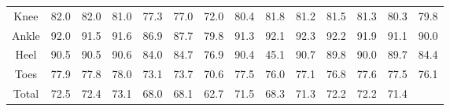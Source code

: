 \documentclass{beamer}
\begin{document}
\begin{frame}
\begin{table}[htbp]
{\begin{adjustbox}{center}
\begin{tabular}{c||ccc|ccc|ccc|ccc|c}
                    Knee & 82.0 & 82.0 & 81.0 & 77.3 & 77.0 & 72.0 & 80.4 & 81.8 & 81.2 & 81.5 & 81.3 & 80.3 & 79.8 \\
                    Ankle & 92.0 & 91.5 & 91.6 & 86.9 & 87.7 & 79.8 & 91.3 & 92.1 & 92.3 & 92.2 & 91.9 & 91.1 & 90.0 \\
                    Heel & 90.5 & 90.5 & 90.6 & 84.0 & 84.7 & 76.9 & 90.4 & 45.1 & 90.7 & 89.8 & 90.0 & 89.7 & 84.4 \\
                    Toes & 77.9 & 77.8 & 78.0 & 73.1 & 73.7 & 70.6 & 77.5 & 76.0 & 77.1 & 76.8 & 77.6 & 77.5 & 76.1 \\
                    \hline
                    Total & 72.5 & 72.4 & 73.1 & 68.0 & 68.1 & 62.7 & 71.5 & 68.3 & 71.3 & 72.2 & 72.2 & 71.4 & \\
                    \hline
                \end{tabular}
            \end{adjustbox}
        }
    \end{table}
\end{frame}
\end{document}
